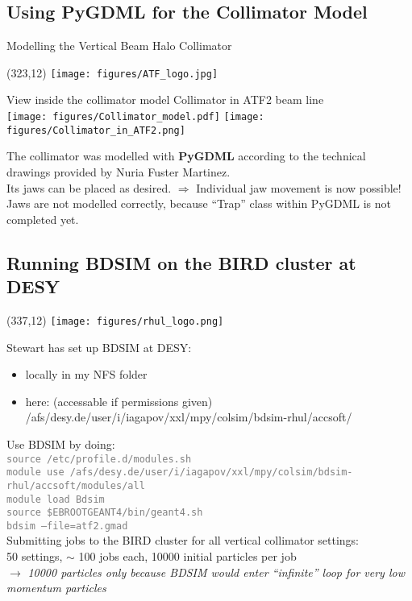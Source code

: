 \documentclass[xcolor={dvipsnames}]{beamer}
\newcommand{\ATFlogo}{
  \setlength{\TPHorizModule}{1pt}
  \setlength{\TPVertModule}{1pt}
  \begin{textblock}{1}(323,12)
   \texttt{[image: figures/ATF\_logo.jpg]}
  \end{textblock}
}
\newcommand{\RHULlogo}{
  \setlength{\TPHorizModule}{1pt}
  \setlength{\TPVertModule}{1pt}
  \begin{textblock}{1}(337,12)
   \texttt{[image: figures/rhul\_logo.png]}
  \end{textblock}
}
\begin{document}
\subsection{Using PyGDML for the Collimator Model}
\begin{frame}{Modelling the Vertical Beam Halo Collimator}
\ATFlogo
\begin{center}
View inside the collimator model \hspace*{1cm} Collimator in ATF2 beam line\\
\vspace*{0.2cm}
 \texttt{[image: figures/Collimator\_model.pdf]}
 \texttt{[image: figures/Collimator\_in\_ATF2.png]}
\end{center}
The collimator was modelled with \textbf{PyGDML} according to the technical drawings provided by Nuria Fuster Martinez.\\
Its jaws can be placed as desired.
$\Rightarrow$ Individual jaw movement is now possible!\\
\vspace*{0.2cm}
Jaws are not modelled correctly, because ``Trap'' class within PyGDML is not completed yet.
\end{frame}

\subsection{Running BDSIM on the BIRD cluster at DESY}
\begin{frame}
\RHULlogo
Stewart has set up BDSIM at DESY:
\begin{itemize}
 \item locally in my NFS folder
 \item here: (accessable if permissions given)\\
 /afs/desy.de/user/i/iagapov/xxl/mpy/colsim/bdsim-rhul/accsoft/
\end{itemize}
\vspace*{0.2cm}
Use BDSIM by doing:\\
\textcolor{Gray}{\texttt{\small source /etc/profile.d/modules.sh\\                                                
module use {\footnotesize /afs/desy.de/user/i/iagapov/xxl/mpy/colsim/bdsim-rhul/accsoft/modules/all}\\
module load Bdsim\\
source \$EBROOTGEANT4/bin/geant4.sh\\
bdsim --file=atf2.gmad
}}\\
\vspace*{0.2cm}
Submitting jobs to the BIRD cluster for all vertical collimator settings:\\
50 settings, $\sim$ 100 jobs each, 10000 initial particles per job\\
$\rightarrow$ \textit{10000 particles only because BDSIM would enter ``infinite'' loop for very low momentum particles}
\end{frame}
\end{document}
